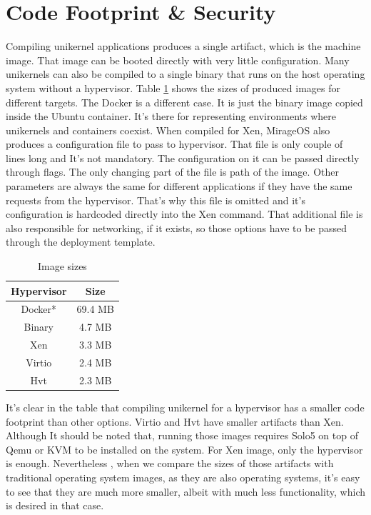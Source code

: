 \section{Code Footprint \& Security}
Compiling unikernel applications produces a single artifact, which is the machine image. That image can be booted directly with very little configuration. Many unikernels can also be compiled to a single binary that runs on the host operating system without a hypervisor. Table \ref{tab:sizes} shows the sizes of produced images for different targets. The Docker is a different case. It is just the binary image copied inside the Ubuntu container. It's there for representing environments where unikernels and containers coexist. When compiled for Xen, MirageOS also produces a configuration file to pass to hypervisor. That file is only couple of lines long and It's not mandatory. The configuration on it can be passed directly through flags. The only changing part of the file is path of the image. Other parameters are always the same for different applications if they have the same requests from the hypervisor. That's why this file is omitted and it's configuration is hardcoded directly into the Xen command. That additional file is also responsible for networking, if it exists, so those options have to be passed through the deployment template.


\begin{table}[htpb]
  
  \centering
  \begin{tabular}{ |c|c| }
    \toprule
      Hypervisor & Size \\
    \midrule
    Docker* & 69.4 MB \\
     
      \hline
      Binary & 4.7 MB \\
    \hline
    Xen &  3.3 MB\\
    \hline
    Virtio & 2.4 MB \\
    \hline
      Hvt & 2.3 MB\\
    \bottomrule
  \end{tabular}
  \caption[Image Sizes]{Image sizes}\label{tab:sizes}
\end{table}


It's clear in the table that compiling unikernel for a hypervisor has a smaller code footprint than other options. Virtio and Hvt have smaller artifacts than Xen. Although It should be noted that, running those images requires Solo5 on top of Qemu or KVM to be installed on the system. For Xen image, only the hypervisor is enough. Nevertheless , when we compare the sizes of those artifacts with traditional operating system images, as they are also operating systems, it's easy to see that they are much more smaller, albeit with much less functionality, which is desired in that case.

